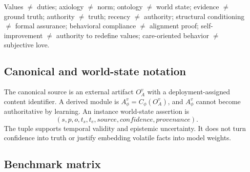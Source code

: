 \noindent Values $\ne$ duties; axiology $\ne$ norm; ontology $\ne$ world state; evidence $\ne$ ground truth; authority $\ne$ truth; recency $\ne$ authority; structural conditioning $\ne$ formal assurance; behavioral compliance $\ne$ alignment proof; self-improvement $\ne$ authority to redefine values; care-oriented behavior $\ne$ subjective love.

\subsection{Canonical and world-state notation}

The canonical source is an external artifact $O_A^v$ with a deployment-assigned content identifier. A derived module is $A_\phi^v=C_\phi(O_A^v)$, and $A_\phi^v$ cannot become authoritative by learning. An instance world-state assertion is
\[
  (s,p,o,t_s,t_e,\mathit{source},\mathit{confidence},\mathit{provenance}).
\]
The tuple supports temporal validity and epistemic uncertainty. It does not turn confidence into truth or justify embedding volatile facts into model weights.

\subsection{Benchmark matrix}

